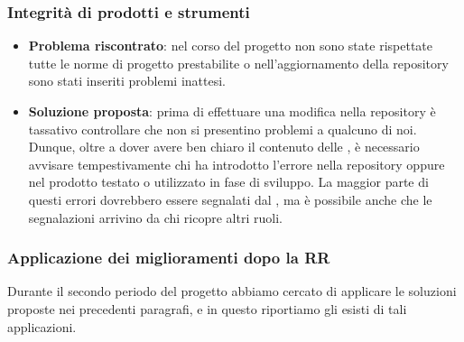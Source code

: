 	\subsubsection{Integrità di prodotti e strumenti}
		\begin{itemize}
			\item \textbf{Problema riscontrato}: nel corso del progetto non sono state rispettate tutte le norme di progetto prestabilite o nell'aggiornamento della repository sono stati inseriti problemi inattesi.
			\item \textbf{Soluzione proposta}: prima di effettuare una modifica nella repository è tassativo controllare che non si presentino problemi a qualcuno di noi. Dunque, oltre a dover avere ben chiaro il contenuto delle \NdP, è necessario avvisare tempestivamente chi ha introdotto l'errore nella repository oppure nel prodotto testato o utilizzato in fase di sviluppo. La maggior parte di questi errori dovrebbero essere segnalati dal \Ver, ma è possibile anche che le segnalazioni arrivino da chi ricopre altri ruoli.
		\end{itemize}
    
    \subsubsection{Applicazione dei miglioramenti dopo la RR}
    Durante il secondo periodo del progetto abbiamo cercato di applicare le soluzioni proposte nei precedenti paragrafi, e in questo riportiamo gli esisti di tali applicazioni.
    
